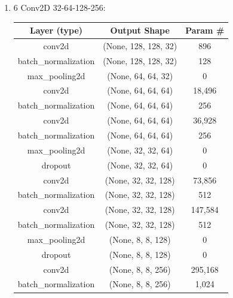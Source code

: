 \documentclass{article}
\begin{document}
\begin{enumerate}
        
        \newpage
        \item 6 Conv2D 32-64-128-256:
            \begin{table}[h!]
                \centering
                \begin{tabular}{| c | c | c |}
                    \hline
                    Layer (type) & Output Shape & Param \# \\
                    \hline
                    conv2d & (None, 128, 128, 32) & 896 \\
                    \hline
                    batch\_normalization & (None, 128, 128, 32) & 128 \\
                    \hline
                    max\_pooling2d & (None, 64, 64, 32) & 0 \\
                    \hline
                    conv2d & (None, 64, 64, 64) & 18,496 \\
                    \hline
                    batch\_normalization & (None, 64, 64, 64) & 256 \\
                    \hline
                    conv2d & (None, 64, 64, 64) & 36,928 \\
                    \hline
                    batch\_normalization & (None, 64, 64, 64) & 256 \\
                    \hline
                    max\_pooling2d & (None, 32, 32, 64) & 0 \\
                    \hline
                    dropout & (None, 32, 32, 64) & 0 \\
                    \hline
                    conv2d & (None, 32, 32, 128) & 73,856 \\
                    \hline
                    batch\_normalization & (None, 32, 32, 128) & 512 \\
                    \hline
                    conv2d & (None, 32, 32, 128) & 147,584 \\
                    \hline
                    batch\_normalization & (None, 32, 32, 128) & 512 \\
                    \hline
                    max\_pooling2d & (None, 8, 8, 128) & 0 \\
                    \hline
                    dropout & (None, 8, 8, 128) & 0 \\
                    \hline
                    conv2d & (None, 8, 8, 256) & 295,168 \\
                    \hline
                    batch\_normalization & (None, 8, 8, 256) & 1,024 \\

\end{tabular}
\end{table}
\end{enumerate}
\end{document}
